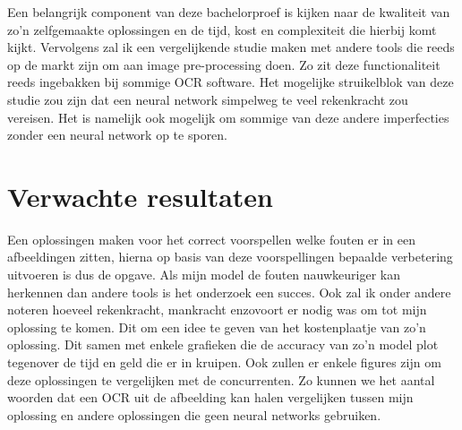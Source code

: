 Een belangrijk component van deze bachelorproef is kijken naar de kwaliteit van zo’n zelfgemaakte oplossingen en de tijd, kost en complexiteit die hierbij komt kijkt. Vervolgens zal ik een vergelijkende studie maken met andere tools die reeds op de markt zijn om aan image pre-processing doen. Zo zit deze functionaliteit reeds ingebakken bij sommige OCR software. Het mogelijke struikelblok van deze studie zou zijn dat een neural network simpelweg te veel rekenkracht zou vereisen. Het is namelijk ook mogelijk om sommige van deze andere imperfecties zonder een neural network op te sporen.




\section{Verwachte resultaten}
\label{sec:verwachte_resultaten}

Een oplossingen maken voor het correct voorspellen welke fouten er in een afbeeldingen zitten, hierna op basis van deze voorspellingen bepaalde verbetering uitvoeren is dus de opgave. Als mijn model de fouten nauwkeuriger kan herkennen dan andere tools is het onderzoek een succes. Ook zal ik onder andere noteren hoeveel rekenkracht, mankracht enzovoort er nodig was om tot mijn oplossing te komen. Dit om een idee te geven van het kostenplaatje van zo'n oplossing. Dit samen met enkele grafieken die de accuracy van zo'n model plot tegenover de tijd en geld die er in kruipen. Ook zullen er enkele figures zijn om deze oplossingen te vergelijken met de concurrenten. Zo kunnen we het aantal woorden dat een OCR uit de afbeelding kan halen vergelijken tussen mijn oplossing en andere oplossingen die geen neural networks gebruiken.


